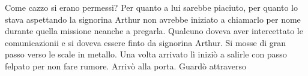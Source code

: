     Come cazzo si erano permessi? Per quanto a lui sarebbe piaciuto, per quanto lo stava aspettando la signorina Arthur
    non avrebbe iniziato a chiamarlo per nome durante quella missione neanche a pregarla. Qualcuno doveva aver
    intercettato le comunicazionii e si doveva essere finto da signorina Arthur. Si mosse di gran passo verso
    le scale in metallo. Una volta arrivato lì iniziò a salirle con passo felpato per non fare rumore. Arrivò alla
    porta. Guardò attraverso 
